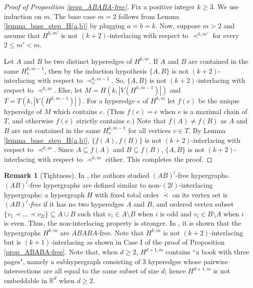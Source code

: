 \documentclass{article}
\newcommand{\RR}{\mathbb{R}}
\theoremstyle{definition}
\newtheorem{remark}[thm]{Remark}
\begin{document}
\begin{proof}[Proof of Proposition \ref{prop_ABABA-free}]
Fix a positive integer $k\geq 3$. We use induction on $m$. The base case $m=2$ follows from Lemma \ref{lemma_base_step_H(a,b)} by plugging $a=b=k$. Now, suppose $m>2$ and assume that $H^{k,m'}$ is not $(k+2)$-interlacing with respect to $\prec^{k,m'}$ for every $2\leq m'<m$.
 
     Let $A$ and $B$ be two distinct hyperedges of $H^{k,m}$. If $A$ and $B$ are contained in the same $H^{k,m-1}_v$, then by the induction hypothesis $\{A, B\}$ is not $(k+2)$-interlacing with respect to $\prec^{k,m-1}_v$.  So, $\{A, B\}$ is not $(k+2)$-interlacing with respect to $\prec^{k,m}$. Else, let $M=H(k,|V(H^{k,m-1})|)$ and $T=T(k,|V(H^{k,m-1})|)$. For a hyperedge $e$ of $H^{k,m}$ let $f(e)$ be the unique hyperedge of $M$ which contains $e$. (Thus $f(e)=e$ when $e$ is a maximal chain of $T$, and otherwise $f(e)$ strictly contains $e$.) Note that $f(A)\neq f(B)$ as $A$ and $B$ are not contained in the same $H^{k,m-1}_v$ for all vertices $v\in T$.
     By Lemma \ref{lemma_base_step_H(a,b)}, $\{f(A), f(B)\}$ is not $(k+2)$-interlacing with respect to $\prec^{k,m}$. Since $A\subseteq f(A)$ and $B \subseteq f(B)$, $\{A,B\}$ is not $(k+2)$-interlacing with respect to $\prec^{k,m}$ either. This completes the proof.
\end{proof}

\begin{remark}[Tightness] 
	In \cite{ABAB_stabbed_pseudodisk, abstract_polychromatic}, the authors studied $(AB)^l$-free hypergraphs. $(AB)^l$-free hypergraphs are defined similar to non-$(2l)$-interlacing hypergraphs: a hypergraph $H$ with fixed total order $\prec$ on its vertex set is \emph{$(AB)^l$-free} if it has no two hyperedges $A$ and $B$, and ordered vertex subset $\{v_1 \prec \dots \prec v_{2l}\}\subseteq A\cup B$ such that $v_i\in A\setminus B$ when $i$ is odd and $v_i \in B\setminus A$ when $i$ is even. Thus, the non-interlacing property is stronger. In \cite{ABAB_stabbed_pseudodisk}, it is shown that the hypergraphs $H^{k,m}$ are $ABABA$-free. Note that $H^{k,m}$ is not $(k+2)$-interlacing but is $(k+1)$-interlacing as shown in Case I of the proof of Proposition \ref{prop_ABABA-free}. 
 Note that, when $d\geq 2$, $H^{d+1,m}$ contains ``a book with three pages", namely a subhypergraph consisting of 3 hyperedges whose pairwise intersections are all equal to the same subset of size $d$; hence $H^{d+1,m}$ is not embeddable in $\RR^d$ when $d\geq 2$. 
\end{remark}
\end{document}
